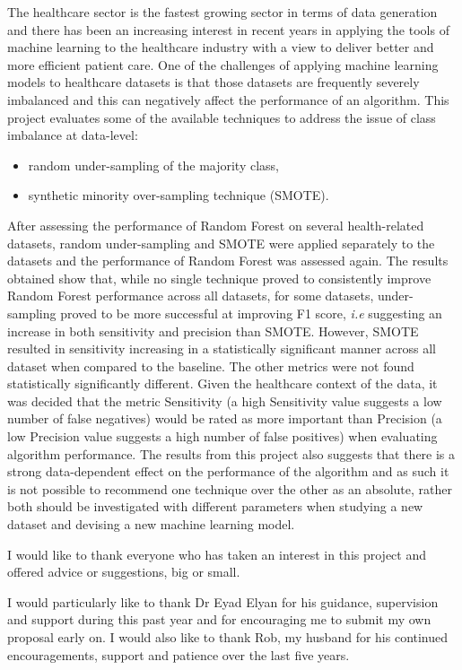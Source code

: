 \beforeabstract
{}

The healthcare sector is the fastest growing sector in terms of data generation and there has been an increasing interest in recent years in applying the tools of machine learning to the healthcare industry with a view to deliver better and more efficient patient care.\newline
One of the challenges of applying machine learning models to healthcare datasets is that those datasets are frequently severely imbalanced and this can negatively affect the performance of an algorithm.\newline
This project evaluates some of the available techniques to address the issue of class imbalance at data-level:
\begin{itemize}
    \item random under-sampling of the majority class,
    \item  synthetic minority over-sampling technique (SMOTE).
\end{itemize}

After assessing the performance of Random Forest on several health-related datasets, random under-sampling and SMOTE were applied separately to the datasets and the performance of Random Forest was assessed again.
The results obtained show that, while no single technique proved to consistently improve Random Forest performance across all datasets, for some datasets, under-sampling proved to be more successful at improving F1 score, \textit{i.e} suggesting an increase in both sensitivity and precision than SMOTE. However, SMOTE resulted in sensitivity increasing in a statistically significant manner across all dataset when compared to the baseline. The other metrics were not found statistically significantly different.\newline
Given the healthcare context of the data, it was decided that the metric Sensitivity (a high Sensitivity value suggests a low number of false negatives) would be rated as more important than Precision (a low Precision value suggests a high number of false positives) when evaluating algorithm performance.\newline
The results from this project also suggests that there is a strong data-dependent effect on the performance of the algorithm and as such it is not possible to recommend one technique over the other as an absolute, rather both should be investigated with different parameters when studying a new dataset and devising a new machine learning model.





I would like to thank everyone who has taken an interest in this project and offered advice or suggestions, big or small. 

I would particularly like to thank Dr Eyad Elyan for his guidance, supervision and support during this past year and for encouraging me to submit my own proposal early on.
I would also like to thank Rob, my husband for his continued encouragements, support and patience over the last five years.


\afterpreface \afterabstract

